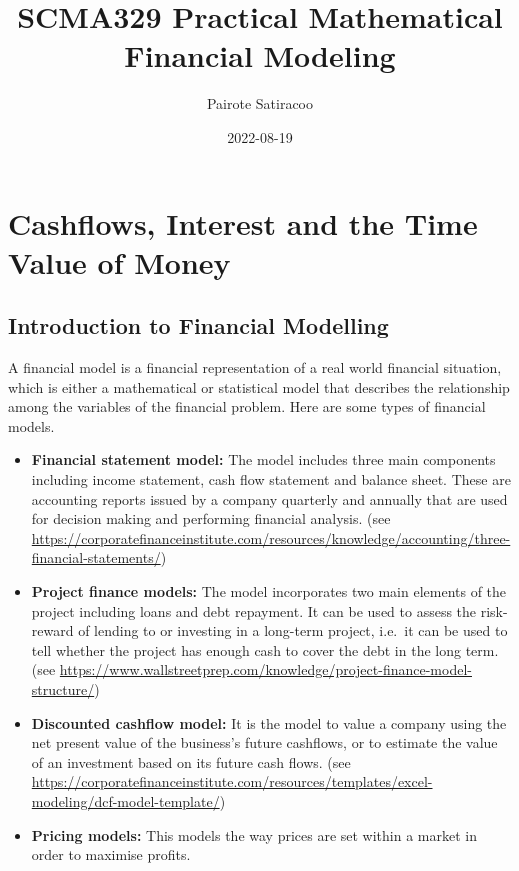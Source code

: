 \documentclass[
]{book}
\title{SCMA329 Practical Mathematical Financial Modeling}
\author{Pairote Satiracoo}
\date{2022-08-19}
\theoremstyle{definition}
\theoremstyle{definition}
\theoremstyle{definition}
\theoremstyle{definition}
\theoremstyle{remark}
\begin{document}
\maketitle

{
\setcounter{tocdepth}{1}
\tableofcontents
}
\hypertarget{cashflows-interest-and-the-time-value-of-money}{%
\chapter{Cashflows, Interest and the Time Value of Money}\label{cashflows-interest-and-the-time-value-of-money}}

\hypertarget{introduction-to-financial-modelling}{%
\section{Introduction to Financial Modelling}\label{introduction-to-financial-modelling}}

A financial model is a financial representation of a real world
financial situation, which is either a mathematical or statistical model
that describes the relationship among the variables of the financial
problem. Here are some types of financial models.

\begin{itemize}
\item
  \textbf{Financial statement model:} The model includes three main
  components including income statement, cash flow statement and
  balance sheet. These are accounting reports issued by a company
  quarterly and annually that are used for decision making and
  performing financial analysis. (see
  \url{https://corporatefinanceinstitute.com/resources/knowledge/accounting/three-financial-statements/})
\item
  \textbf{Project finance models:} The model incorporates two main elements
  of the project including loans and debt repayment. It can be used to
  assess the risk-reward of lending to or investing in a long-term
  project, i.e.~it can be used to tell whether the project has enough
  cash to cover the debt in the long term. (see
  \url{https://www.wallstreetprep.com/knowledge/project-finance-model-structure/})
\item
  \textbf{Discounted cashflow model:} It is the model to value a company
  using the net present value of the business's future cashflows, or
  to estimate the value of an investment based on its future cash
  flows. (see
  \url{https://corporatefinanceinstitute.com/resources/templates/excel-modeling/dcf-model-template/})
\item
  \textbf{Pricing models:} This models the way prices are set within a
  market in order to maximise profits.
\end{itemize}
\end{document}
